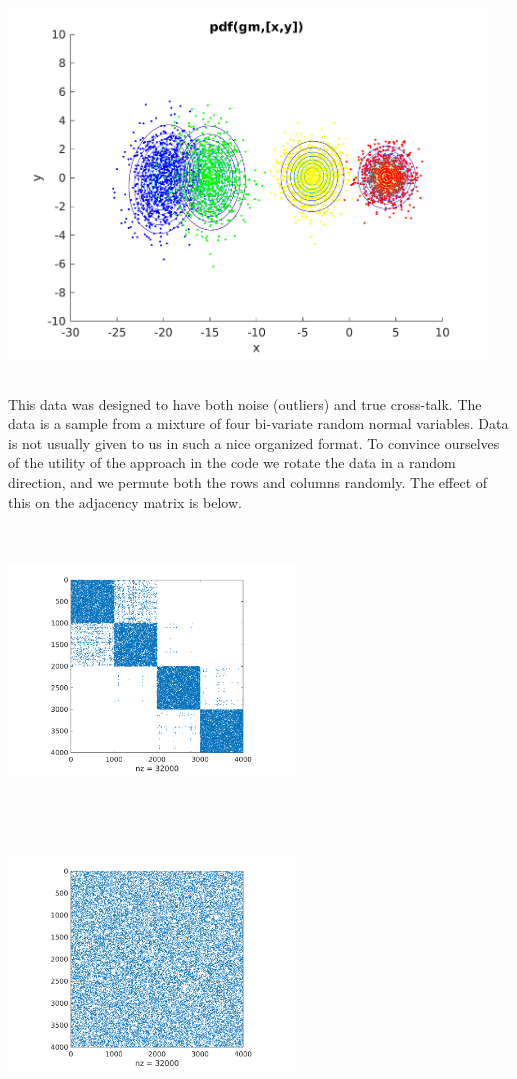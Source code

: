 \includegraphics[width=5in,height=4in]{images/4class.png}

This data was designed to have both noise (outliers) and true cross-talk. The data is a sample from a mixture of four bi-variate random normal variables.  Data is not usually given to us in such a nice organized format. To convince ourselves of the utility of the approach in the code we rotate the data in a random direction, and we permute both the rows and columns randomly. The effect of this on the adjacency matrix is below. 

\includegraphics[width=3in,height=3in]{images/spy.png}
\includegraphics[width=3in,height=3in]{images/spy_randomized.png}

